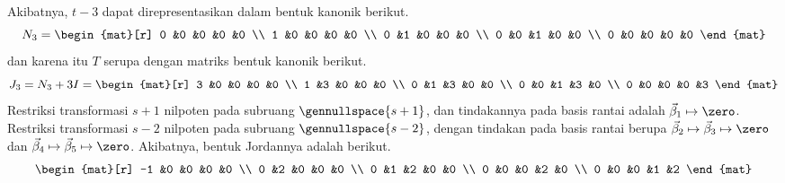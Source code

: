 \begin{exercises}
\begin{answer}
\begin{exparts}
          Akibatnya, $t-3$ dapat direpresentasikan dalam bentuk kanonik berikut.
          \begin{equation*}
            N_3=
            \begin{mat}[r]
               0  &0  &0  &0  &0  \\
               1  &0  &0  &0  &0  \\
               0  &1  &0  &0  &0  \\
               0  &0  &1  &0  &0  \\
               0  &0  &0  &0  &0
             \end{mat}
          \end{equation*}
          dan karena itu $T$ serupa dengan matriks bentuk kanonik berikut.
          \begin{equation*}
           J_3=N_3+3I=
           \begin{mat}[r]
               3  &0  &0  &0  &0  \\
               1  &3  &0  &0  &0  \\
               0  &1  &3  &0  &0  \\
               0  &0  &1  &3  &0  \\
               0  &0  &0  &0  &3
             \end{mat}
         \end{equation*} 
         \partsitem Restriksi transformasi $s+1$ nilpoten
          pada subruang $\gennullspace{s+1}$, dan tindakannya pada
          basis rantai adalah $\vec{\beta}_1\mapsto\zero$.
          Restriksi transformasi $s-2$ nilpoten
          pada subruang $\gennullspace{s-2}$, dengan tindakan pada
          basis rantai berupa $\vec{\beta}_2\mapsto\vec{\beta}_3\mapsto\zero$
          dan $\vec{\beta}_4\mapsto\vec{\beta}_5\mapsto\zero$.
          Akibatnya, bentuk Jordannya adalah berikut.
          \begin{equation*}
            \begin{mat}[r]
              -1  &0  &0  &0  &0  \\
               0  &2  &0  &0  &0  \\
               0  &1  &2  &0  &0  \\
               0  &0  &0  &2  &0  \\
               0  &0  &0  &1  &2
             \end{mat} 
          \end{equation*}
      \end{exparts}  
    \end{answer}

\end{exercises}
